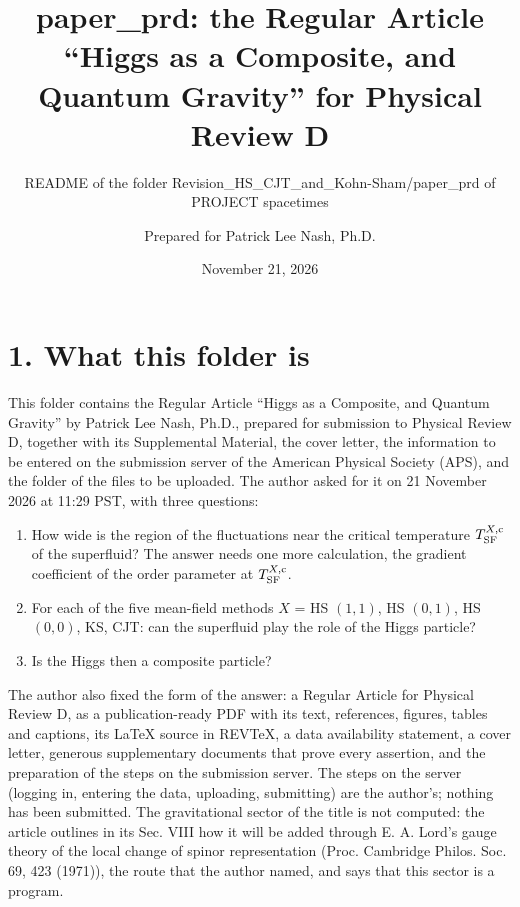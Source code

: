 \documentclass[
  10pt,
]{article}
\title{paper\_prd: the Regular Article ``Higgs as a Composite, and
Quantum Gravity'' for Physical Review D}
\subtitle{README of the folder
Revision\_HS\_CJT\_and\_Kohn-Sham/paper\_prd of PROJECT spacetimes}
\author{Prepared for Patrick Lee Nash, Ph.D.}
\date{November 21, 2026}
\providecommand{\tightlist}{%
  \setlength{\itemsep}{0pt}\setlength{\parskip}{0pt}}
\begin{document}
\maketitle

\hypertarget{what-this-folder-is}{%
\section{1. What this folder is}\label{what-this-folder-is}}

This folder contains the Regular Article ``Higgs as a Composite, and
Quantum Gravity'' by Patrick Lee Nash, Ph.D., prepared for submission to
Physical Review D, together with its Supplemental Material, the cover
letter, the information to be entered on the submission server of the
American Physical Society (APS), and the folder of the files to be
uploaded. The author asked for it on 21 November 2026 at 11:29 PST, with
three questions:

\begin{enumerate}
\def\labelenumi{\arabic{enumi}.}
\tightlist
\item
  How wide is the region of the fluctuations near the critical
  temperature \(T^{X,{\rm c}}_{\rm SF}\) of the superfluid? The answer
  needs one more calculation, the gradient coefficient of the order
  parameter at \(T^{X,{\rm c}}_{\rm SF}\).
\item
  For each of the five mean-field methods \(X\) = HS \((1,1)\), HS
  \((0,1)\), HS \((0,0)\), KS, CJT: can the superfluid play the role of
  the Higgs particle?
\item
  Is the Higgs then a composite particle?
\end{enumerate}

The author also fixed the form of the answer: a Regular Article for
Physical Review D, as a publication-ready PDF with its text, references,
figures, tables and captions, its LaTeX source in REVTeX, a data
availability statement, a cover letter, generous supplementary documents
that prove every assertion, and the preparation of the steps on the
submission server. The steps on the server (logging in, entering the
data, uploading, submitting) are the author's; nothing has been
submitted. The gravitational sector of the title is not computed: the
article outlines in its Sec. VIII how it will be added through E. A.
Lord's gauge theory of the local change of spinor representation (Proc.
Cambridge Philos. Soc. 69, 423 (1971)), the route that the author named,
and says that this sector is a program.
\end{document}
